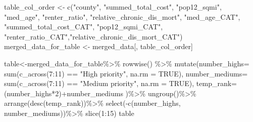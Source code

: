 \documentclass[
]{article}
\newenvironment{Shaded}{\begin{snugshade}}{\end{snugshade}}
\newcommand{\AttributeTok}[1]{\textcolor[rgb]{0.77,0.63,0.00}{#1}}
\newcommand{\ConstantTok}[1]{\textcolor[rgb]{0.00,0.00,0.00}{#1}}
\newcommand{\DecValTok}[1]{\textcolor[rgb]{0.00,0.00,0.81}{#1}}
\newcommand{\FunctionTok}[1]{\textcolor[rgb]{0.00,0.00,0.00}{#1}}
\newcommand{\NormalTok}[1]{#1}
\newcommand{\OtherTok}[1]{\textcolor[rgb]{0.56,0.35,0.01}{#1}}
\newcommand{\SpecialCharTok}[1]{\textcolor[rgb]{0.00,0.00,0.00}{#1}}
\newcommand{\StringTok}[1]{\textcolor[rgb]{0.31,0.60,0.02}{#1}}
\begin{document}
\begin{Shaded}
\begin{Highlighting}[]
\NormalTok{table\_col\_order }\OtherTok{\textless{}{-}} \FunctionTok{c}\NormalTok{(}\StringTok{"county"}\NormalTok{, }\StringTok{"summed\_total\_cost"}\NormalTok{, }\StringTok{"pop12\_sqmi"}\NormalTok{,}
                     \StringTok{"med\_age"}\NormalTok{, }\StringTok{"renter\_ratio"}\NormalTok{,}
                     \StringTok{"relative\_chronic\_dis\_mort"}\NormalTok{, }\StringTok{"med\_age\_CAT"}\NormalTok{,}
                     \StringTok{"summed\_total\_cost\_CAT"}\NormalTok{, }\StringTok{"pop12\_sqmi\_CAT"}\NormalTok{,}
                     \StringTok{"renter\_ratio\_CAT"}\NormalTok{,}\StringTok{"relative\_chronic\_dis\_mort\_CAT"}\NormalTok{)}
\NormalTok{merged\_data\_for\_table }\OtherTok{\textless{}{-}}\NormalTok{ merged\_data[, table\_col\_order]}

\NormalTok{ table}\OtherTok{\textless{}{-}}\NormalTok{merged\_data\_for\_table}\SpecialCharTok{\%\textgreater{}\%}
  \FunctionTok{rowwise}\NormalTok{() }\SpecialCharTok{\%\textgreater{}\%}
  \FunctionTok{mutate}\NormalTok{(}\AttributeTok{number\_highs=} \FunctionTok{sum}\NormalTok{(}\FunctionTok{c\_across}\NormalTok{(}\DecValTok{7}\SpecialCharTok{:}\DecValTok{11}\NormalTok{) }\SpecialCharTok{==} \StringTok{"High priority"}\NormalTok{, }\AttributeTok{na.rm =} \ConstantTok{TRUE}\NormalTok{),}
         \AttributeTok{number\_mediums=} \FunctionTok{sum}\NormalTok{(}\FunctionTok{c\_across}\NormalTok{(}\DecValTok{7}\SpecialCharTok{:}\DecValTok{11}\NormalTok{) }\SpecialCharTok{==} \StringTok{"Medium priority"}\NormalTok{, }\AttributeTok{na.rm =} \ConstantTok{TRUE}\NormalTok{),}
         \AttributeTok{temp\_rank=}\NormalTok{(number\_highs}\SpecialCharTok{*}\DecValTok{2}\NormalTok{)}\SpecialCharTok{+}\NormalTok{number\_mediums}
\NormalTok{         )}\SpecialCharTok{\%\textgreater{}\%}
   \FunctionTok{ungroup}\NormalTok{()}\SpecialCharTok{\%\textgreater{}\%}
   \FunctionTok{arrange}\NormalTok{(}\FunctionTok{desc}\NormalTok{(temp\_rank))}\SpecialCharTok{\%\textgreater{}\%}
   \FunctionTok{select}\NormalTok{(}\SpecialCharTok{{-}}\FunctionTok{c}\NormalTok{(number\_highs, number\_mediums))}\SpecialCharTok{\%\textgreater{}\%}
   \FunctionTok{slice}\NormalTok{(}\DecValTok{1}\SpecialCharTok{:}\DecValTok{15}\NormalTok{)}
\NormalTok{table}
\end{Highlighting}
\end{Shaded}
\end{document}
